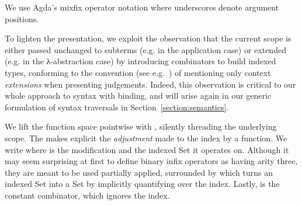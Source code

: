 \begin{center}
\end{center}

We use Agda's mixfix operator notation where underscores denote
argument positions.

To lighten the presentation, we exploit the observation that the
current scope is either passed unchanged to subterms (e.g. in the
application case) or extended (e.g. in the λ-abstraction case) by
introducing combinators to build indexed types, conforming to the
convention (see e.g.~\citet{martin1982constructive}) of mentioning only
context \emph{extensions} when presenting judgements. Indeed, this
observation is critical to our whole approach to syntax with binding,
and will arise again in our generic formulation of syntax traversals
in Section~\ref{section:semantics}.

\begin{center}
\begin{minipage}{0.4\textwidth}
\end{minipage}\hfill
\begin{minipage}{0.5\textwidth}
\end{minipage}
\newline
\begin{minipage}{0.4\textwidth}
\end{minipage}\hfill
\begin{minipage}{0.5\textwidth}
\end{minipage}
\end{center}

We lift the function space pointwise with , silently
threading the underlying scope. The  makes explicit the
\emph{adjustment} made to the index by a function. We write 
  where  is the modification and  the indexed
Set it operates on. Although it may seem surprising at first to define
binary infix operators as having arity three, they are meant to be
used partially applied, surrounded by  which turns an
indexed Set into a Set by implicitly quantifying over the index.
Lastly,  is the constant combinator, which ignores the
index.

